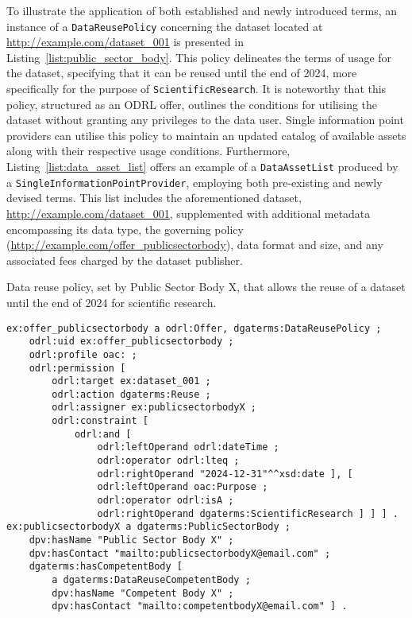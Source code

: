 To illustrate the application of both established and newly introduced terms, an instance of a \texttt{DataReusePolicy} concerning the dataset located at \url{http://example.com/dataset_001} is presented in Listing~\ref{list:public_sector_body}.
This policy delineates the terms of usage for the dataset, specifying that it can be reused until the end of 2024, more specifically for the purpose of \texttt{ScientificResearch}.
It is noteworthy that this policy, structured as an ODRL offer, outlines the conditions for utilising the dataset without granting any privileges to the data user.
Single information point providers can utilise this policy to maintain an updated catalog of available assets along with their respective usage conditions.
Furthermore, Listing~\ref{list:data_asset_list} offers an example of a \texttt{DataAssetList} produced by a \texttt{SingleInformationPointProvider}, employing both pre-existing and newly devised terms.
This list includes the aforementioned dataset, \url{http://example.com/dataset_001}, supplemented with additional metadata encompassing its data type, the governing policy (\url{http://example.com/offer_publicsectorbody}), data format and size, and any associated fees charged by the dataset publisher.

\begin{listing}[ht]
\caption{Data reuse policy, set by Public Sector Body X, that allows the reuse of a dataset until the end of 2024 for scientific research.}
\label{list:public_sector_body}
\begin{verbatim}
ex:offer_publicsectorbody a odrl:Offer, dgaterms:DataReusePolicy ;
    odrl:uid ex:offer_publicsectorbody ;
    odrl:profile oac: ;
    odrl:permission [
        odrl:target ex:dataset_001 ;
        odrl:action dgaterms:Reuse ;
        odrl:assigner ex:publicsectorbodyX ;
        odrl:constraint [
            odrl:and [
                odrl:leftOperand odrl:dateTime ;
                odrl:operator odrl:lteq ;
                odrl:rightOperand "2024-12-31"^^xsd:date ], [
                odrl:leftOperand oac:Purpose ;
                odrl:operator odrl:isA ;
                odrl:rightOperand dgaterms:ScientificResearch ] ] ] .
ex:publicsectorbodyX a dgaterms:PublicSectorBody ;
    dpv:hasName "Public Sector Body X" ;
    dpv:hasContact "mailto:publicsectorbodyX@email.com" ;
    dgaterms:hasCompetentBody [
        a dgaterms:DataReuseCompetentBody ;
        dpv:hasName "Competent Body X" ;
        dpv:hasContact "mailto:competentbodyX@email.com" ] .
\end{verbatim}
\end{listing}

